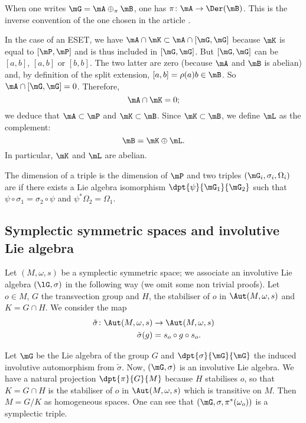 \begin{remark}
When one writes $\mG=\mA\oplus_{\pi}\mB$, one has $\pi\colon \mA\to \Der(\mB)$. This is the inverse convention of the one chosen in the article \cite{StrictSolvableSym}.
\end{remark}

 In the case of an ESET, we have $\mA\cap\mK\subset\mA\cap[\mG,\mG]$ because $\mK$ is equal to $[\mP,\mP]$ and is thus included in $[\mG,\mG]$. But $[\mG,\mG]$ can be $[a,b]$, $[a,b]$ or $[b,b]$. The two latter are zero (because $\mA$ and $\mB$ is abelian) and, by definition of the split extension, $[a,b]=\rho(a)b\in\mB$. So $\mA\cap[\mG,\mG]=0$. Therefore,
\[
  \mA\cap\mK=0;
\]
we deduce that $\mA\subset\mP$ and $\mK\subset \mB$. Since $\mK\subset\mB$, we define $\mL$ as the complement:
\[
  \mB=\mK\oplus\mL.
\]
In particular, $\mK$ and $\mL$ are abelian.

The dimension of a triple is the dimension of $\mP$ and two triples $(\mG_i,\sigma_i,\Omega_i)$ are  if there exists a Lie algebra isomorphism $\dpt{\psi}{\mG_1}{\mG_2}$ such that $\psi\circ\sigma_1=\sigma_2\circ \psi$ and $\psi^*\Omega_2=\Omega_1$.

\subsection{Symplectic symmetric spaces and involutive Lie algebra}

Let $(M,\omega,s)$ be a symplectic symmetric space; we associate an involutive Lie algebra $(\lG,\sigma)$ in the following way (we omit some non trivial proofs). Let $o\in M$, $G$ the transvection group and $H$, the stabiliser of $o$ in $\Aut(M,\omega,s)$ and $K=G\cap H$. We consider the map
\begin{equation}
	\begin{aligned}
		\tilde\sigma\colon \Aut(M,\omega,s)&\to \Aut(M,\omega,s) \\
		\tilde\sigma(g)&=s_o\circ g\circ s_o.
	\end{aligned}
\end{equation}

Let $\mG$ be the Lie algebra of the group $G$ and $\dpt{\sigma}{\mG}{\mG}$ the induced involutive automorphism from $\tilde\sigma$. Now, $(\mG,\sigma)$ is an involutive Lie algebra. We have a natural projection $\dpt{\pi}{G}{M}$ because $H$ stabilises $o$, so that $K=G\cap H$ is the stabiliser of $o$ in $\Aut(M,\omega,s)$ which is transitive on $M$. Then $M=G/K$ as homogeneous spaces. One can see that $(\mG,\sigma,\pi^*(\omega_o))$ is a symplectic triple.

